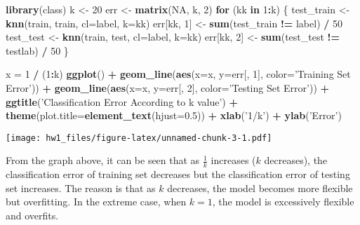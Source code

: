 \documentclass[]{article}
\newenvironment{Shaded}{\begin{snugshade}}{\end{snugshade}}
\newcommand{\ControlFlowTok}[1]{\textcolor[rgb]{0.13,0.29,0.53}{\textbf{#1}}}
\newcommand{\DataTypeTok}[1]{\textcolor[rgb]{0.13,0.29,0.53}{#1}}
\newcommand{\DecValTok}[1]{\textcolor[rgb]{0.00,0.00,0.81}{#1}}
\newcommand{\FloatTok}[1]{\textcolor[rgb]{0.00,0.00,0.81}{#1}}
\newcommand{\KeywordTok}[1]{\textcolor[rgb]{0.13,0.29,0.53}{\textbf{#1}}}
\newcommand{\NormalTok}[1]{#1}
\newcommand{\OperatorTok}[1]{\textcolor[rgb]{0.81,0.36,0.00}{\textbf{#1}}}
\newcommand{\OtherTok}[1]{\textcolor[rgb]{0.56,0.35,0.01}{#1}}
\newcommand{\StringTok}[1]{\textcolor[rgb]{0.31,0.60,0.02}{#1}}
\begin{document}
\begin{Shaded}
\begin{Highlighting}[]
\KeywordTok{library}\NormalTok{(class)}
\NormalTok{k <-}\StringTok{ }\DecValTok{20}
\NormalTok{err <-}\StringTok{ }\KeywordTok{matrix}\NormalTok{(}\OtherTok{NA}\NormalTok{, k, }\DecValTok{2}\NormalTok{)}
\ControlFlowTok{for}\NormalTok{ (kk }\ControlFlowTok{in} \DecValTok{1}\OperatorTok{:}\NormalTok{k) \{}
\NormalTok{  test_train <-}\StringTok{ }\KeywordTok{knn}\NormalTok{(train, train, }\DataTypeTok{cl=}\NormalTok{label, }\DataTypeTok{k=}\NormalTok{kk)}
\NormalTok{  err[kk, }\DecValTok{1}\NormalTok{] <-}\StringTok{ }\KeywordTok{sum}\NormalTok{(test_train }\OperatorTok{!=}\StringTok{ }\NormalTok{label) }\OperatorTok{/}\StringTok{ }\DecValTok{50}
\NormalTok{  test_test <-}\StringTok{ }\KeywordTok{knn}\NormalTok{(train, test, }\DataTypeTok{cl=}\NormalTok{label, }\DataTypeTok{k=}\NormalTok{kk)}
\NormalTok{  err[kk, }\DecValTok{2}\NormalTok{] <-}\StringTok{ }\KeywordTok{sum}\NormalTok{(test_test }\OperatorTok{!=}\StringTok{ }\NormalTok{testlab) }\OperatorTok{/}\StringTok{ }\DecValTok{50}
\NormalTok{\}}

\NormalTok{x =}\StringTok{ }\DecValTok{1} \OperatorTok{/}\StringTok{ }\NormalTok{(}\DecValTok{1}\OperatorTok{:}\NormalTok{k)}
\KeywordTok{ggplot}\NormalTok{() }\OperatorTok{+}\StringTok{ }\KeywordTok{geom_line}\NormalTok{(}\KeywordTok{aes}\NormalTok{(}\DataTypeTok{x=}\NormalTok{x, }\DataTypeTok{y=}\NormalTok{err[, }\DecValTok{1}\NormalTok{], }\DataTypeTok{color=}\StringTok{'Training Set Error'}\NormalTok{)) }\OperatorTok{+}\StringTok{ }\KeywordTok{geom_line}\NormalTok{(}\KeywordTok{aes}\NormalTok{(}\DataTypeTok{x=}\NormalTok{x, }\DataTypeTok{y=}\NormalTok{err[, }\DecValTok{2}\NormalTok{], }\DataTypeTok{color=}\StringTok{'Testing Set Error'}\NormalTok{)) }\OperatorTok{+}\StringTok{ }\KeywordTok{ggtitle}\NormalTok{(}\StringTok{'Classification Error According to k value'}\NormalTok{) }\OperatorTok{+}\StringTok{ }\KeywordTok{theme}\NormalTok{(}\DataTypeTok{plot.title=}\KeywordTok{element_text}\NormalTok{(}\DataTypeTok{hjust=}\FloatTok{0.5}\NormalTok{)) }\OperatorTok{+}\StringTok{ }\KeywordTok{xlab}\NormalTok{(}\StringTok{'1/k'}\NormalTok{) }\OperatorTok{+}\StringTok{ }\KeywordTok{ylab}\NormalTok{(}\StringTok{'Error'}\NormalTok{)}
\end{Highlighting}
\end{Shaded}

\texttt{[image: hw1\_files/figure-latex/unnamed-chunk-3-1.pdf]}

From the graph above, it can be seen that as \(\frac{1}{k}\) increases
(\(k\) decreases), the classification error of training set decreases
but the classification error of testing set increases. The reason is
that as \(k\) decreases, the model becomes more flexible but
overfitting. In the extreme case, when \(k=1\), the model is excessively
flexible and overfits.
\end{document}
